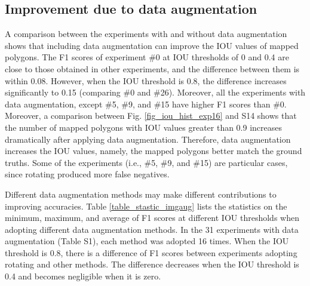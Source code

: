 \documentclass[authoryear,preprint,review,12pt]{elsarticle}
\begin{document}
\subsection{Improvement due to data augmentation}
\label{subsec_contrib_dataAug}

A comparison between the experiments with and without data augmentation shows that including data augmentation can improve the IOU values of mapped polygons. The F1 scores of experiment \#0 at IOU thresholds of 0 and 0.4 are close to those obtained in other experiments, and the difference between them is within 0.08. 
However, when the IOU threshold is 0.8, the difference increases significantly to 0.15 (comparing \#0 and \#26). Moreover, all the experiments with data augmentation, except \#5, \#9, and \#15 have higher F1 scores than \#0. Moreover, a comparison between Fig. \ref{fig_iou_hist_exp16} and S14 shows that the number of mapped polygons with IOU values greater than 0.9 increases dramatically after applying data augmentation. Therefore, data augmentation increases the IOU values, namely, the mapped polygons better match the ground truths. Some of the experiments (i.e., \#5, \#9, and \#15) are particular cases, since rotating produced more false negatives. 



Different data augmentation methods may make different contributions to improving accuracies. Table \ref{table_stastic_imgaug} lists the statistics on the minimum, maximum, and average of F1 scores at different IOU thresholds when adopting different data augmentation methods. 
In the 31 experiments with data augmentation (Table S1), each method was adopted 16 times.
When the IOU threshold is 0.8, there is a difference of F1 scores between experiments adopting rotating and other methods. The difference decreases when the IOU threshold is 0.4 and becomes negligible when it is zero. 
\end{document}

